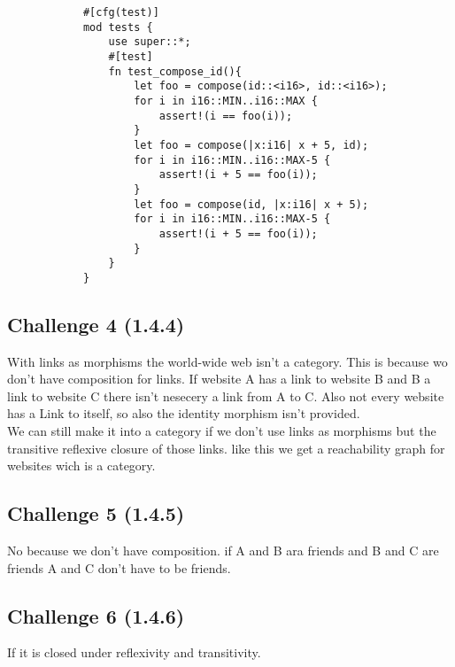 \documentclass[11pt]{article}
\begin{document}
        \begin{verbatim}
            #[cfg(test)]
            mod tests {
                use super::*;
                #[test]
                fn test_compose_id(){
                    let foo = compose(id::<i16>, id::<i16>);
                    for i in i16::MIN..i16::MAX {
                        assert!(i == foo(i));
                    }
                    let foo = compose(|x:i16| x + 5, id);
                    for i in i16::MIN..i16::MAX-5 {
                        assert!(i + 5 == foo(i));
                    }
                    let foo = compose(id, |x:i16| x + 5);
                    for i in i16::MIN..i16::MAX-5 {
                        assert!(i + 5 == foo(i));
                    }
                }
            }
        \end{verbatim}

    \subsection*{Challenge 4 (1.4.4)}
        With links as morphisms the world-wide web isn't a category. This is because wo don't have composition for links. If website A has a link to website B and B a link to website C there isn't nesecery a link from A to C. Also not every website has a Link to itself, so also the identity morphism isn't provided.\\
        We can still make it into a category if we don't use links as morphisms but the transitive reflexive closure of those links. like this we get a reachability graph for websites wich is a category. 
            
    \subsection*{Challenge 5 (1.4.5)}
        No because we don't have composition. if A and B ara friends and B and C are friends A and C don't have to be friends. 

    \subsection*{Challenge 6 (1.4.6)}
        If it is closed under reflexivity and transitivity.
\end{document}

